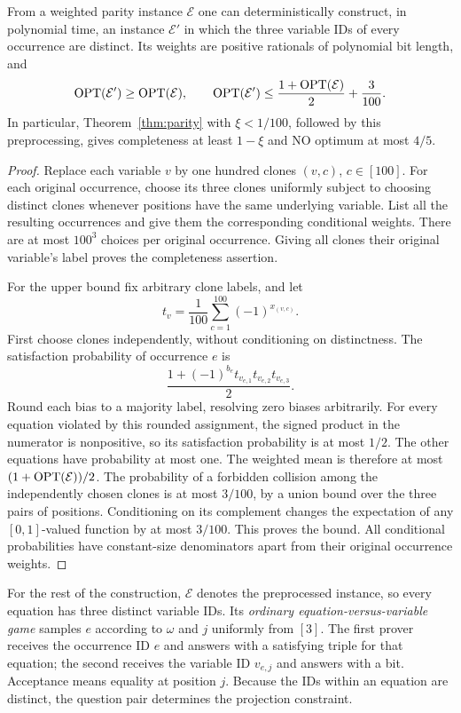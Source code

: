 \begin{lemma}
\label{lem:distinct-parity}
From a weighted parity instance \(\mathcal E\) one can deterministically
construct, in polynomial time, an instance \(\mathcal E'\) in which the
three variable IDs of every occurrence are distinct.  Its weights are
positive rationals of polynomial bit length, and
\[
 \operatorname{OPT}(\mathcal E')\ge\operatorname{OPT}(\mathcal E),
 \qquad
 \operatorname{OPT}(\mathcal E')
 \le \frac{1+\operatorname{OPT}(\mathcal E)}2+\frac3{100}.
\]
In particular, Theorem~\ref{thm:parity} with \(\xi<1/100\), followed by
this preprocessing, gives completeness at least \(1-\xi\) and NO
optimum at most \(4/5\).
\end{lemma}

\begin{proof}
Replace each variable \(v\) by one hundred clones \((v,c)\),
\(c\in[100]\).  For each original occurrence, choose its three clones
uniformly subject to choosing distinct clones whenever positions have
the same underlying variable.  List all the resulting occurrences and
give them the corresponding conditional weights.  There are at most
\(100^3\) choices per original occurrence.  Giving all clones their
original variable's label proves the completeness assertion.

For the upper bound fix arbitrary clone labels, and let
\[
 t_v=\frac1{100}\sum_{c=1}^{100}(-1)^{x_{(v,c)}}.
\]
First choose clones independently, without conditioning on distinctness.
The satisfaction probability of occurrence \(e\) is
\[
 \frac{1+(-1)^{b_e}t_{v_{e,1}}t_{v_{e,2}}t_{v_{e,3}}}{2}.
\]
Round each bias to a majority label, resolving zero biases arbitrarily.
For every equation violated by this rounded assignment, the signed
product in the numerator is nonpositive, so its satisfaction probability
is at most \(1/2\).  The other equations have probability at most one.
The weighted mean is therefore at most
\((1+\operatorname{OPT}(\mathcal E))/2\).  The probability of a forbidden collision
among the independently chosen clones is at most \(3/100\), by a union
bound over the three pairs of positions.  Conditioning on its complement
changes the expectation of any \([0,1]\)-valued function by at most
\(3/100\).  This proves the bound.  All conditional probabilities have
constant-size denominators apart from their original occurrence weights.
\end{proof}

For the rest of the construction, \(\mathcal E\) denotes the
preprocessed instance, so every equation has three distinct variable
IDs.  Its \emph{ordinary equation-versus-variable game} samples
\(e\) according to \(\omega\) and \(j\) uniformly from \([3]\).
The first prover receives the occurrence ID \(e\) and answers with a
satisfying triple for that equation; the second receives the variable ID
\(v_{e,j}\) and answers with a bit.  Acceptance means equality at
position \(j\).  Because the IDs within an equation are distinct,
the question pair determines the projection constraint.

